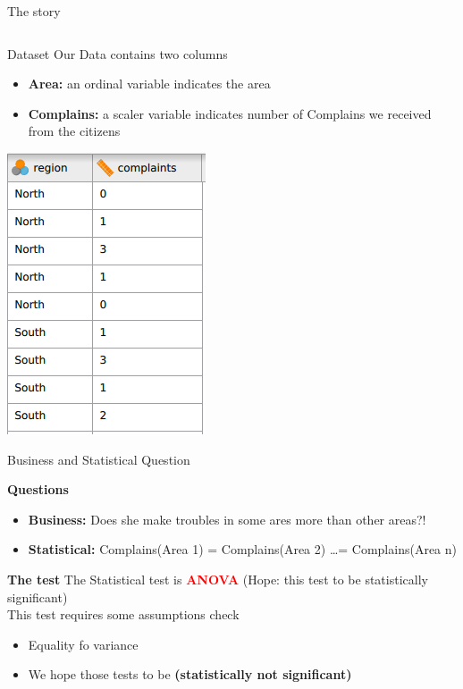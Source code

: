 \documentclass[8pt]{beamer}
\begin{document}
\begin{frame}{The story}
\begin{columns}
            \end{columns}
        \end{frame}

        \begin{frame}{Dataset}
            Our Data contains two columns
            \begin{itemize}
                \item \textbf{Area:} an ordinal variable indicates the area
                \item \textbf{Complains:} a scaler variable indicates number of Complains we received from the citizens
            \end{itemize}
            \centering
            \includegraphics[height=.5\textheight]{images/data.png}
        \end{frame}

        \begin{frame}{Business and Statistical Question}
            \begin{block}{\textbf{Questions}}
                \begin{itemize}
                    \item \textbf{Business:} Does she make troubles in some ares more than other areas?!
                    \item \textbf{Statistical:} Complains(Area 1) = Complains(Area 2) \ldots = Complains(Area n)
                \end{itemize}
            \end{block}

            \begin{block}{\textbf{The test}}
                The Statistical test is \textcolor{red}{\textbf{ANOVA}} (Hope: this test to be statistically significant)\\
                This test requires some assumptions check \\ 
                \begin{itemize}
                    \item Equality fo variance 
                    \item We hope those tests to be \textbf{(statistically not significant)}
                \end{itemize}
            \end{block}
        \end{frame}
\end{document}
